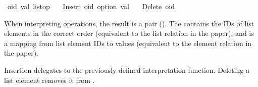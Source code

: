 \begin{isabelle}
\isamarkupfalse%
\ {\isacharparenleft}{\isacharprime}oid{\isacharcomma}\ {\isacharprime}val{\isacharparenright}\ list{\isacharunderscore}op\ {\isacharequal}\isanewline
\ \ Insert\ {\isachardoublequoteopen}{\isacharprime}oid\ option{\isachardoublequoteclose}\ {\isachardoublequoteopen}{\isacharprime}val{\isachardoublequoteclose}\ {\isacharbar}\isanewline
\ \ Delete\ {\isachardoublequoteopen}{\isacharprime}oid{\isachardoublequoteclose}%
\end{isabelle}

When interpreting operations, the result is a pair ().
The  contains the IDs of list elements in the correct order (equivalent to the list relation in the paper), and  is a mapping from list element IDs to values (equivalent to the element relation in the paper).

Insertion delegates to the previously defined  interpretation function.
Deleting a list element removes it from .

